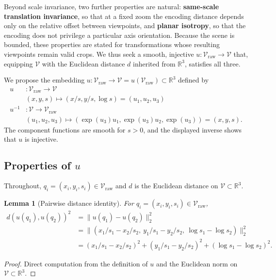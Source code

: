 \documentclass{article}
\newtheorem{lemma}{Lemma}[section]
\begin{document}
Beyond scale invariance, two further properties are natural: \textbf{same-scale translation invariance}, so that at a fixed zoom the encoding distance depends only on the relative offset between viewpoints, and \textbf{planar isotropy}, so that the encoding does not privilege a particular axis orientation. Because the scene is bounded, these properties are stated for transformations whose resulting viewpoints remain valid crops. We thus seek a smooth, injective $u : \mathcal{V}_{\mathrm{raw}} \to \mathcal{V}$ that, equipping $\mathcal{V}$ with the Euclidean distance $d$ inherited from $\mathbb{R}^3$, satisfies all three.

We propose the embedding $u : \mathcal{V}_{\mathrm{raw}} \to \mathcal{V} = u(\mathcal{V}_{\mathrm{raw}}) \subset \mathbb{R}^3$ defined by
\begin{align*}
u &: \mathcal{V}_{\mathrm{raw}} \to \mathcal{V} \\
& (x,y,s) \mapsto ( x/s, y/s, \log s ) = (u_1, u_2, u_3) \\
u^{-1} &: \mathcal{V} \to \mathcal{V}_{\mathrm{raw}} \\
& (u_1, u_2, u_3) \mapsto (\exp(u_3) u_1, \exp(u_3) u_2, \exp(u_3)) = (x,y,s).
\end{align*}
The component functions are smooth for $s > 0$, and the displayed inverse shows that $u$ is injective.

\subsection{Properties of $u$}\label{sec:vpe-properties}

Throughout, $q_i = (x_i, y_i, s_i) \in \mathcal{V}_{\mathrm{raw}}$ and $d$ is the Euclidean distance on $\mathcal{V} \subset \mathbb{R}^3$.

\begin{lemma}[Pairwise distance identity]\label{lem:pairwise}
For $q_i = (x_i, y_i, s_i) \in \mathcal{V}_{\mathrm{raw}}$,
\begin{align*}
d(u(q_1), u(q_2))^2 &= \| u(q_1) - u(q_2) \|_2^2 \\
&= \| ( x_1/s_1 - x_2/s_2,\ y_1/s_1 - y_2/s_2,\ \log s_1 - \log s_2 ) \|_2^2 \\
&= ( x_1/s_1 - x_2/s_2 )^2 + ( y_1/s_1 - y_2/s_2 )^2 + ( \log s_1 - \log s_2 )^2.
\end{align*}
\end{lemma}
\begin{proof}
Direct computation from the definition of $u$ and the Euclidean norm on $\mathcal{V} \subset \mathbb{R}^3$.
\end{proof}
\end{document}
